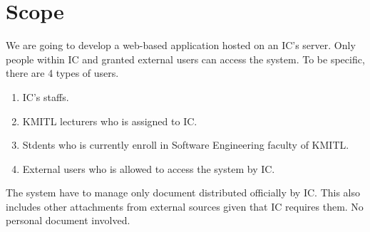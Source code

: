 \section{Scope}
We are going to develop a web-based application hosted on an IC's server.
Only people within IC and granted external users can access the system.
To be specific, there are 4 types of users.
\begin{enumerate}
\item IC's staffs.
\item KMITL lecturers who is assigned to IC.
\item Stdents who is currently enroll in Software Engineering faculty of KMITL.
\item External users who is allowed to access the system by IC.
\end{enumerate}

The system have to manage only document distributed officially by IC.
This also includes other attachments from external sources given that IC requires them.
No personal document involved.